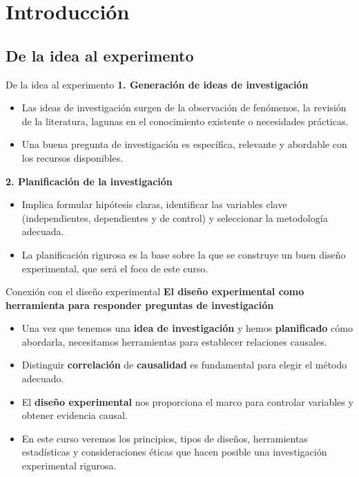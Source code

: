 ﻿\documentclass{beamer}
\begin{document}

\section{Introducción}

\subsection{De la idea al experimento}

\begin{frame}{De la idea al experimento}
   \textbf{1. Generación de ideas de investigación}
   \begin{itemize}
      \item Las ideas de investigación surgen de la observación de fenómenos, la revisión de la literatura, lagunas en el conocimiento existente o necesidades prácticas.
      \item Una buena pregunta de investigación es específica, relevante y abordable con los recursos disponibles.
   \end{itemize}
   \vspace{0.3cm}
   \textbf{2. Planificación de la investigación}
   \begin{itemize}
      \item Implica formular hipótesis claras, identificar las variables clave (independientes, dependientes y de control) y seleccionar la metodología adecuada.
      \item La planificación rigurosa es la base sobre la que se construye un buen diseño experimental, que será el foco de este curso.
   \end{itemize}
\end{frame}

\begin{frame}{Conexión con el diseño experimental}
   \centering
   \textbf{El diseño experimental como herramienta para responder preguntas de investigación}
   \vspace{0.4cm}

   \begin{itemize}
      \item Una vez que tenemos una \textbf{idea de investigación} y hemos \textbf{planificado} cómo abordarla, necesitamos herramientas para establecer relaciones causales.
      \item Distinguir \textbf{correlación} de \textbf{causalidad} es fundamental para elegir el método adecuado.
      \item El \textbf{diseño experimental} nos proporciona el marco para controlar variables y obtener evidencia causal.
      \item En este curso veremos los principios, tipos de diseños, herramientas estadísticas y consideraciones éticas que hacen posible una investigación experimental rigurosa.
   \end{itemize}
\end{frame}
\end{document}
